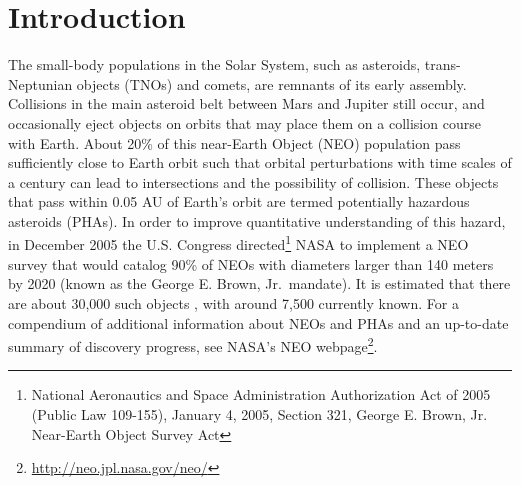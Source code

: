 
\section{Introduction}

The small-body populations in the Solar System, such as asteroids, trans-Neptunian objects (TNOs)
and comets, are remnants of its early assembly. Collisions in the main asteroid belt between Mars and
Jupiter still occur, and occasionally eject objects on orbits that may place them on a collision course
with Earth. About 20\% of this near-Earth Object (NEO) population pass sufficiently close to Earth orbit such that
orbital perturbations with time scales of a century can lead to intersections and the possibility of collision. These objects that pass within 0.05 AU of Earth's orbit are termed potentially hazardous asteroids (PHAs).
In order to improve quantitative understanding of this hazard, in December 2005 the U.S. Congress
directed\footnote{National Aeronautics and Space Administration Authorization Act of 2005 (Public Law 109-155), January 4, 2005, Section 321, George E. Brown, Jr. Near-Earth Object Survey Act} NASA to implement a NEO survey that
would catalog 90\% of NEOs with diameters larger than 140 meters by 2020 (known as the George
E. Brown, Jr.\ mandate). It is estimated that there are about 30,000 such objects \citep{harris15}, with around 7,500 currently known.
For a compendium of additional information about NEOs and PHAs and an up-to-date summary of
discovery progress, see NASA's NEO webpage\footnote{\url{http://neo.jpl.nasa.gov/neo/}}.

